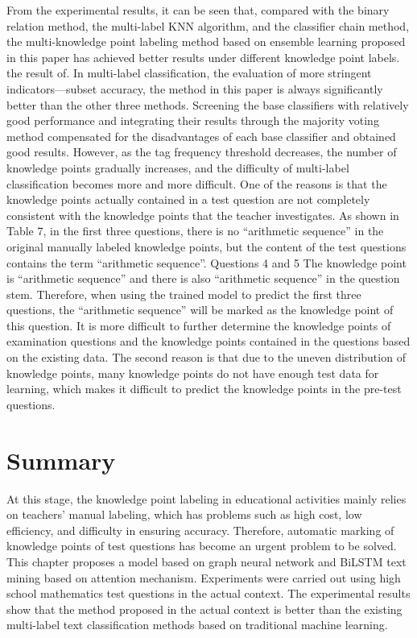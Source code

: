 From the experimental results, it can be seen that, compared with the binary relation method, the multi-label KNN algorithm, and the classifier chain method, the multi-knowledge point labeling method based on ensemble learning proposed in this paper has achieved better results under different knowledge point labels. the result of. In multi-label classification, the evaluation of more stringent indicators—subset accuracy, the method in this paper is always significantly better than the other three methods. Screening the base classifiers with relatively good performance and integrating their results through the majority voting method compensated for the disadvantages of each base classifier and obtained good results. However, as the tag frequency threshold decreases, the number of knowledge points gradually increases, and the difficulty of multi-label classification becomes more and more difficult. One of the reasons is that the knowledge points actually contained in a test question are not completely consistent with the knowledge points that the teacher investigates. As shown in Table 7, in the first three questions, there is no ``arithmetic sequence'' in the original manually labeled knowledge points, but the content of the test questions contains the term ``arithmetic sequence''. Questions 4 and 5 The knowledge point is ``arithmetic sequence'' and there is also ``arithmetic sequence'' in the question stem. Therefore, when using the trained model to predict the first three questions, the ``arithmetic sequence'' will be marked as the knowledge point of this question. It is more difficult to further determine the knowledge points of examination questions and the knowledge points contained in the questions based on the existing data. The second reason is that due to the uneven distribution of knowledge points, many knowledge points do not have enough test data for learning, which makes it difficult to predict the knowledge points in the pre-test questions.
\section{Summary}
At this stage, the knowledge point labeling in educational activities mainly relies on teachers' manual labeling, which has problems such as high cost, low efficiency, and difficulty in ensuring accuracy. Therefore, automatic marking of knowledge points of test questions has become an urgent problem to be solved. This chapter proposes a model based on graph neural network and BiLSTM text mining based on attention mechanism. Experiments were carried out using high school mathematics test questions in the actual context. The experimental results show that the method proposed in the actual context is better than the existing multi-label text classification methods based on traditional machine learning.


